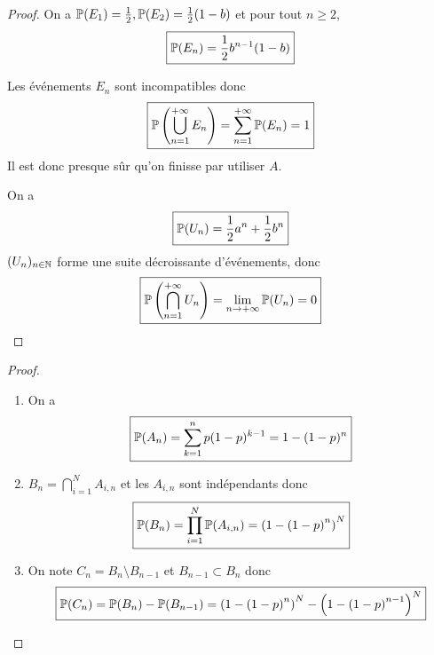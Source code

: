 \begin{proof}
    On a $\P(E_{1})=\frac{1}{2},\P(E_{2})=\frac{1}{2}(1-b)$ et pour tout $n\geqslant2$,
    \begin{equation}
        \boxed{\P(E_{n})=\frac{1}{2}b^{n-1}(1-b)}
    \end{equation}

    Les événements $E_{n}$ sont incompatibles donc 
    \begin{equation}
        \boxed{\P\left(\bigcup_{n=1}^{+\infty}E_{n}\right)=\sum_{n=1}^{+\infty}\P(E_{n})=1}
    \end{equation}
    Il est donc presque sûr qu'on finisse par utiliser $A$.

    On a 
    \begin{equation}
        \boxed{\P(U_{n})=\frac{1}{2}a^{n}+\frac{1}{2}b^{n}}
    \end{equation}
    $(U_{n})_{n\in\N}$ forme une suite décroissante d'événements, donc 
    \begin{equation}
        \boxed{\P\left(\bigcap_{n=1}^{+\infty}U_{n}\right)=\lim\limits_{n\to+\infty}\P(U_{n})=0}
    \end{equation}
\end{proof}

\begin{proof}
    \phantom{}
    \begin{enumerate}
        \item On a 
        \begin{equation}
            \boxed{\P(A_{n})=\sum_{k=1}^{n}p(1-p)^{k-1}=1-(1-p)^{n}}
        \end{equation}

        \item $B_{n}=\bigcap_{i=1}^{N}A_{i,n}$ et les $A_{i,n}$ sont indépendants donc 
        \begin{equation}
            \boxed{\P(B_{n})=\prod_{i=1}^{N}\P(A_{i,n})=\left(1-\left(1-p\right)^{n}\right)^{N}}
        \end{equation}

        \item On note $C_{n}=B_{n}\setminus B_{n-1}$ et $B_{n-1}\subset B_{n}$ donc 
        \begin{equation}
            \boxed{\P(C_{n})=\P(B_{n})-\P(B_{n-1})=\left(1-\left(1-p\right)^{n}\right)^{N}-\left(1-\left(1-p\right)^{n-1}\right)^{N}}
        \end{equation}
    \end{enumerate}
\end{proof}

